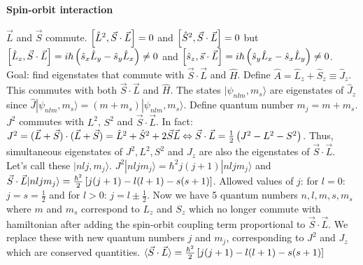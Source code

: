 \paragraph{Spin-orbit interaction}
$\vec{L}$ and $\vec{S}$ commute. $\left[ \hat{L}^2 , \vec{S} \cdot \vec{L} \right] = 0$
and $\left[ \hat{S}^2 , \vec{S} \cdot \vec{L} \right] = 0$ but
$\left[ \hat{L}_z , \vec{S} \cdot \vec{L} \right] = i \hbar \left( \hat{s}_x \hat{L}_y - \hat{s}_y \hat{L}_x \right) \neq 0$
and $\left[ \hat{s}_z , \vec{s} \cdot \vec{L} \right] = i \hbar \left( \hat{s}_y \hat{L}_x - \hat{s}_x \hat{L}_y \right) \neq 0$.
Goal: find eigenstates that commute with $\vec{S} \cdot \vec{L}$ and $\hat{H}$.
Define $\hat{A} = \hat{L}_z + \hat{S}_z \equiv \hat{J}_z$. This commutes with both
$\vec{S} \cdot \vec{L}$ and $\hat{H}$. The states $| \psi_{nlm} , m_s \rangle$ are
eigenstates of $\hat{J}_z$ since $\hat{J} | \psi_{nlm} , m_s \rangle = (m+m_s) | \psi_{nlm} ,m_s \rangle$.
Define quantum number $m_j = m + m_s$. $J^2$ commutes with $L^2$, $S^2$ and $\vec{S} \cdot \vec{L}$.
In fact: $J^2 = (\vec{L} + \vec{S}) \cdot (\vec{L} + \vec{S}) = \hat{L}^2 + \hat{S}^2 + 2 \vec{S} \vec{L}
\Leftrightarrow \vec{S} \cdot \vec{L} = \frac{1}{2} \left( J^2 - L^2 - S^2 \right)$.
Thus, simultaneous eigenstates of $J^2,L^2,S^2$ and $J_z$ are also the eigenstates
of $\vec{S} \cdot \vec{L}$. Let's call these $| nlj , m_j \rangle$.
$J^2 | n l j m_j \rangle = \hbar^2 j (j+1) | n l j m_j \rangle$ and
$\vec{S} \cdot \vec{L} | n l j m_j \rangle = \frac{\hbar^2}{2} \left[ j(j+1) -
l(l+1) - s(s+1) \right]$. Allowed values of $j$: for $l=0$: $j=s=\frac{1}{2}$ and for
$l>0$: $j = l \pm \frac{1}{2}$.
Now we have 5 quantum numbers $n,l,m,s,m_s$ where $m$ and $m_s$ correspond to
$L_z$ and $S_z$ which no longer commute with hamiltonian after adding the spin-orbit
coupling term proportional to $\vec{S} \cdot \vec{L}$. We replace these with new
quantum numbers $j$ and $m_j$, corresponding to $J^2$ and $J_z$ which are conserved
quantities.
$\langle \vec{S} \cdot \vec{L} \rangle = \frac{\hbar^2}{2} \left[ j(j+1) - l(l+1) - s(s+1) \right]$
